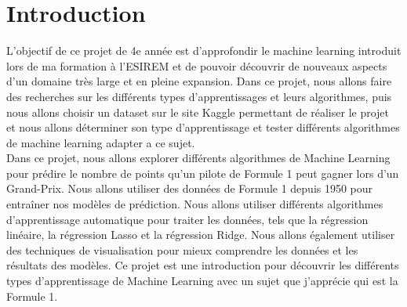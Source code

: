\chapter{Introduction}

L'objectif de ce projet de 4e année est d'approfondir le machine learning introduit lors de ma formation à l'ESIREM et de pouvoir découvrir de nouveaux aspects d'un domaine très large et en pleine expansion. Dans ce projet, nous allons faire des recherches sur les différents types d'apprentissages et leurs algorithmes, puis nous allons choisir un dataset sur le site Kaggle permettant de réaliser le projet et nous allons déterminer son type d'apprentissage et tester différents algorithmes de machine learning adapter a ce sujet.\\

Dans ce projet, nous allons explorer différents algorithmes de Machine Learning pour prédire le nombre de points qu'un pilote de Formule 1 peut gagner lors d'un Grand-Prix. Nous allons utiliser des données de Formule 1 depuis 1950 pour entraîner nos modèles de prédiction. Nous allons utiliser différents algorithmes d'apprentissage automatique pour traiter les données, tels que la régression linéaire, la régression Lasso et la régression Ridge. Nous allons également utiliser des techniques de visualisation pour mieux comprendre les données et les résultats des modèles. Ce projet est une introduction pour découvrir les différents types d'apprentissage de Machine Learning avec un sujet que j'apprécie qui est la Formule 1.